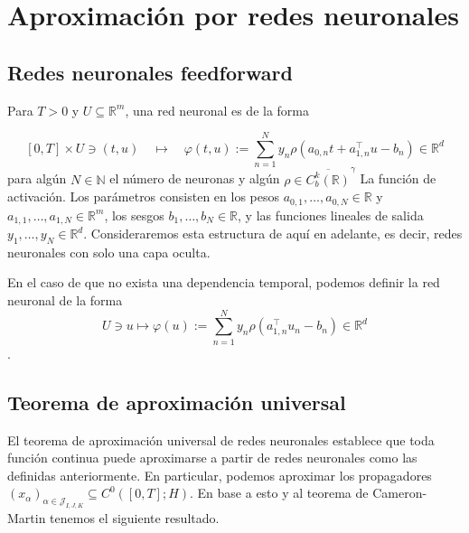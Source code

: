 \section{Aproximación por redes neuronales}

\subsection{Redes neuronales feedforward}

\begin{defn}
  Para $T>0$ y $U \subseteq \mathbb{R}^m$, una red neuronal es de la forma

  $$
  [0, T] \times U \ni(t, u) \quad \mapsto \quad \varphi(t, u):=\sum_{n=1}^N y_n \rho\left(a_{0, n} t+a_{1, n}^{\top} u-b_n\right) \in \mathbb{R}^d
  $$
  para algún $N \in \mathbb{N}$ el número de neuronas y algún $\rho \in{\overline{C_b^k(\mathbb{R})}}^\gamma$ La función de activación. Los parámetros consisten en los pesos $a_{0,1}, \ldots, a_{0, N} \in \mathbb{R}$ y $a_{1,1}, \ldots, a_{1, N} \in \mathbb{R}^m$, los sesgos $b_1, \ldots, b_N \in \mathbb{R}$, y las funciones lineales de salida $y_1, \ldots, y_N \in \mathbb{R}^d$. Consideraremos esta estructura de aquí en adelante, es decir, redes neuronales con solo una capa oculta.

  En el caso de que no exista una dependencia temporal, podemos definir la red neuronal de la forma
  $$U \ni u \mapsto \varphi(u):=\sum_{n=1}^N y_n \rho\left(a_{1, n}^{\top} u_n-b_n\right) \in \mathbb{R}^d$$.
\end{defn}

\subsection{Teorema de aproximación universal}

El teorema de aproximación universal de redes neuronales establece que toda función continua puede aproximarse a partir de redes neuronales como las definidas anteriormente. En particular, podemos aproximar los propagadores $\left(x_\alpha\right)_{\alpha \in \mathcal{J}_{I, J, K}} \subseteq C^0([0, T] ; H)$. En base a esto y al teorema de Cameron-Martin tenemos el siguiente resultado.

